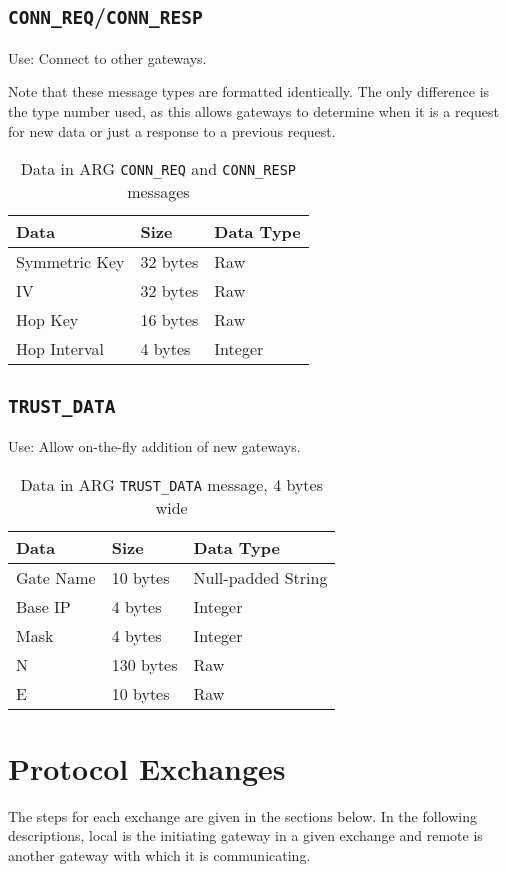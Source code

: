 \subsection{\texttt{CONN\_REQ}/\texttt{CONN\_RESP}}
\par Use: Connect to other gateways.

\par Note that these message types are formatted identically. The only difference is the type number used, as this allows gateways to determine when it is a request for new data or just a response to a previous request.

\begin{table}[H]
\caption{Data in \ac{ARG} \texttt{CONN\_REQ} and \texttt{CONN\_RESP} messages}
\label{tbl:arg_conn_data_struct}
\centering
\begin{tabular}{l|l|l}
\textbf{Data} & \textbf{Size} & \textbf{Data Type}\\
\hline
Symmetric Key & 32 bytes & Raw\\
\ac{IV} & 32 bytes & Raw\\
Hop Key & 16 bytes & Raw\\
Hop Interval & 4 bytes & Integer
\end{tabular}
\end{table}

\subsection{\texttt{TRUST\_DATA}}
\par Use: Allow on-the-fly addition of new gateways.

\begin{table}[H]
\caption{Data in \ac{ARG} \texttt{TRUST\_DATA} message, 4 bytes wide}
\label{tbl:arg_trust_struct}
\centering
\begin{tabular}{l|l|l}
\textbf{Data} & \textbf{Size} & \textbf{Data Type}\\
\hline
Gate Name & 10 bytes & Null-padded String\\
Base \ac{IP} & 4 bytes & Integer\\
Mask & 4 bytes & Integer\\
N & 130 bytes & Raw\\
E & 10 bytes & Raw
\end{tabular}
\end{table}

\section{Protocol Exchanges}
\label{sec:arg_protocol_exchanges}
\par The steps for each exchange are given in the sections below. In the following descriptions, local is the initiating gateway in a given exchange and remote is another gateway with which it is communicating.

